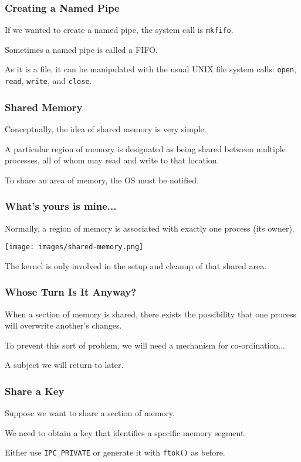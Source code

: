\begin{frame}
	\frametitle{Creating a Named Pipe}

	If we wanted to create a named pipe, the system call is \texttt{mkfifo}.

	Sometimes a named pipe is called a FIFO.

	As it is a file, it can be manipulated with the usual UNIX file system calls: \texttt{open}, \texttt{read}, \texttt{write}, and \texttt{close}.

\end{frame}


\begin{frame}
	\frametitle{Shared Memory}

	Conceptually, the idea of shared memory is very simple.

	A particular region of memory is designated as being shared between multiple processes, all of whom may read and write to that location.

	To share an area of memory, the OS must be notified.

\end{frame}


\begin{frame}
	\frametitle{What's yours is mine...}

	Normally, a region of memory is associated with exactly one process (its owner).


	\begin{center}
		\texttt{[image: images/shared-memory.png]}
	\end{center}

	The kernel is only involved in the setup and cleanup of that shared area.

\end{frame}


\begin{frame}
	\frametitle{Whose Turn Is It Anyway?}

	When a section of memory is shared, there exists the possibility that one process will overwrite another's changes.

	To prevent this sort of problem, we will need a mechanism for co-ordination...

	A subject we will return to later.

\end{frame}


\begin{frame}[fragile]
	\frametitle{Share a Key}

	Suppose we want to share a section of memory.

	We need to obtain a key that identifies a specific memory segment.

Either use \texttt{IPC\_PRIVATE} or generate it with \texttt{ftok()} as before.

\end{frame}



